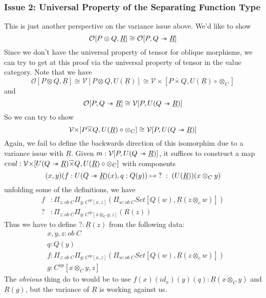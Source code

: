 \documentclass{article}
\newcommand{\sep}{\mathrel{-\mkern-6mu*}}
\begin{document}
\subsubsection{Issue 2: Universal Property of the Separating Function Type}
This is just another perspective on the variance issue above. We'd like to show
\[
    \mathcal{O}[P \otimes Q , \underline{R}] \cong \mathcal{O}[P , Q \sep \underline{R}]    
\]
Since we don't have the universal property of tensor for oblique morphisms, we can try to get at this proof via the 
universal property of tensor in the value category. Note that we have
\[
    \mathcal{O}[P \otimes Q , \underline{R}] \cong \mathcal{V}[P \otimes Q , U(\underline{R})] \cong \mathcal{V\times}[P \overline{\times} Q , U(\underline{R}) \circ \otimes_C] 
\]
and 
\[
    \mathcal{O}[P , Q \sep \underline{R}] \cong \mathcal{V}[P , U(Q \sep \underline{R})]
\]
So we can try to show 
\[
    \mathcal{V\times}[P \overline{\times} Q , U(\underline{R}) \circ \otimes_C] \cong \mathcal{V}[P , U(Q \sep \underline{R})]
\]
Again, we fail to define the backwards direction of this isomorphim due to a variance issue with $\underline{R}$. 
Given $m : \mathcal{V}[P , U(Q \sep \underline{R})]$, it suffices to construct a map 
$eval : \mathcal{V\times}[ U(Q \sep \underline{R}) \overline{\times} Q , U(\underline{R}) \circ \otimes_C] $ with components 
\[
    (x , y)(f : U(Q \sep \underline{R})(x), q : Q(y)) \mapsto \;? \;: \;  (U(\underline{R}))(x \otimes_C y)    
\]
unfolding some of the definitions, we have 
\begin{align*}
    f &: \Pi_{z : ob \;C}\Pi_{g : C^{op}[x , z]}(\Pi_{w : ob \; C}Set[Q(w), \underline{R}(z \otimes_c w)])\\
    ? &: \Pi_{z : ob \;C}\Pi_{g : C^{op}[x \otimes_C y, z]}(R(z))
\end{align*}
Thus we have to define $? : \underline{R}(z)$ from the following data:
\begin{align*}
    &x,y,z : ob \;C \\
    &q : Q(y)\\
    &f : \Pi_{z : ob \;C}\Pi_{g : C^{op}[x , z]}(\Pi_{w : ob \; C}Set[Q(w), \underline{R}(z \otimes_c w)])\\
    &g : C^{op}[x\otimes_C y , z]
\end{align*}
The \textit{obvious} thing do to would be to use $f (x)(id_x)(y)(q) : \underline{R}(x \otimes_C y)$ and $\underline{R}(g)$, 
but the variance of $\underline{R}$ is working against us.
\end{document}
